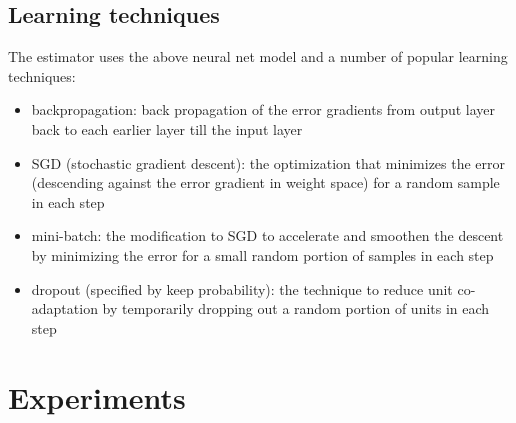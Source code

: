 \documentclass{article}
\begin{document}
\subsection{Learning techniques}
The estimator uses the above neural net model and a number of popular learning 
techniques:
\begin{itemize}
	\item backpropagation: back propagation of the error gradients from output 
	layer back to each earlier layer till the input layer 
	\cite{rumelhart1988learning}
	\item SGD (stochastic gradient descent): the optimization that minimizes 
	the error (descending against the error gradient in weight space) for a 
	random sample in each step \cite{lecun2012efficient}
	\item mini-batch: the modification to SGD to accelerate and smoothen the 
	descent by minimizing the error for a small random portion of samples in 
	each step \cite{mairal2010online}
	\item dropout (specified by keep probability): the technique to reduce unit 
	co-adaptation by temporarily dropping out a random portion of units in each 
	step \cite{srivastava2014dropout}
\end{itemize}

\section{Experiments}
\end{document}
